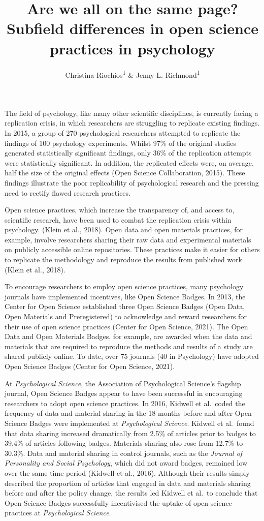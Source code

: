\documentclass[
  english,
  man,floatsintext]{apa6}
\title{Are we all on the same page? Subfield differences in open science practices in psychology}
\author{Christina Riochios\textsuperscript{1} \& Jenny L. Richmond\textsuperscript{1}}
\date{}
\affiliation{\vspace{0.5cm}\textsuperscript{1} University of New South Wales}
\begin{document}
\maketitle

The field of psychology, like many other scientific disciplines, is currently facing a replication crisis, in which researchers are struggling to replicate existing findings. In 2015, a group of 270 psychological researchers attempted to replicate the findings of 100 psychology experiments. Whilst 97\% of the original studies generated statistically significant findings, only 36\% of the replication attempts were statistically significant. In addition, the replicated effects were, on average, half the size of the original effects (Open Science Collaboration, 2015). These findings illustrate the poor replicability of psychological research and the pressing need to rectify flawed research practices.

Open science practices, which increase the transparency of, and access to, scientific research, have been used to combat the replication crisis within psychology. (Klein et al., 2018). Open data and open materials practices, for example, involve researchers sharing their raw data and experimental materials on publicly accessible online repositories. These practices make it easier for others to replicate the methodology and reproduce the results from published work (Klein et al., 2018).

To encourage researchers to employ open science practices, many psychology journals have implemented incentives, like Open Science Badges. In 2013, the Center for Open Science established three Open Science Badges (Open Data, Open Materials and Preregistered) to acknowledge and reward researchers for their use of open science practices (Center for Open Science, 2021). The Open Data and Open Materials Badges, for example, are awarded when the data and materials that are required to reproduce the methods and results of a study are shared publicly online. To date, over 75 journals (40 in Psychology) have adopted Open Science Badges (Center for Open Science, 2021).

At \emph{Psychological Science}, the Association of Psychological Science's flagship journal, Open Science Badges appear to have been successful in encouraging researchers to adopt open science practices. In 2016, Kidwell et al.~coded the frequency of data and material sharing in the 18 months before and after Open Science Badges were implemented at \emph{Psychological Science}. Kidwell et al.~found that data sharing increased dramatically from 2.5\% of articles prior to badges to 39.4\% of articles following badges. Materials sharing also rose from 12.7\% to 30.3\%. Data and material sharing in control journals, such as the \emph{Journal of Personality and Social Psychology}, which did not award badges, remained low over the same time period (Kidwell et al., 2016). Although their results simply described the proportion of articles that engaged in data and materials sharing before and after the policy change, the results led Kidwell et al.~to conclude that Open Science Badges successfully incentivised the uptake of open science practices at \emph{Psychological Science}.
\end{document}
